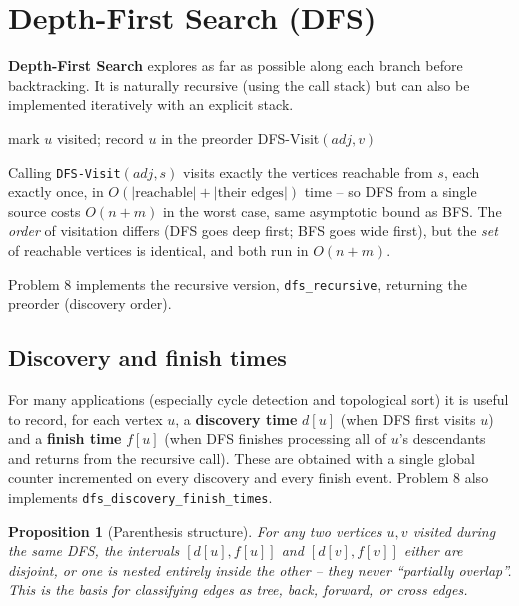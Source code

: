 \documentclass[11pt]{article}
\newtheorem{proposition}[theorem]{Proposition}
\begin{document}
\section{Depth-First Search (DFS)}

\textbf{Depth-First Search} explores as far as possible along each branch before
backtracking. It is naturally recursive (using the call stack) but can also be
implemented iteratively with an explicit stack.

\begin{algorithm}[h]
\caption{DFS-Visit$(adj, u)$ -- recursive}
\begin{algorithmic}[1]
\State mark $u$ visited; record $u$ in the preorder
        \State DFS-Visit$(adj, v)$
    \EndIf
\EndFor
\end{algorithmic}
\end{algorithm}

Calling \texttt{DFS-Visit}$(adj, s)$ visits exactly the vertices reachable from $s$, each
exactly once, in $O(|\text{reachable}| + |\text{their edges}|)$ time -- so DFS from a
single source costs $O(n+m)$ in the worst case, same asymptotic bound as BFS. The
\emph{order} of visitation differs (DFS goes deep first; BFS goes wide first), but the
\emph{set} of reachable vertices is identical, and both run in $O(n+m)$.

Problem 8 implements the recursive version, \texttt{dfs\_recursive}, returning the
preorder (discovery order).

\subsection{Discovery and finish times}

For many applications (especially cycle detection and topological sort) it is useful to
record, for each vertex $u$, a \textbf{discovery time} $d[u]$ (when DFS first visits $u$)
and a \textbf{finish time} $f[u]$ (when DFS finishes processing all of $u$'s descendants
and returns from the recursive call). These are obtained with a single global counter
incremented on every discovery and every finish event. Problem 8 also implements
\texttt{dfs\_discovery\_finish\_times}.

\begin{proposition}[Parenthesis structure]
For any two vertices $u, v$ visited during the same DFS, the intervals $[d[u], f[u]]$ and
$[d[v], f[v]]$ either are disjoint, or one is nested entirely inside the other -- they
never ``partially overlap''. This is the basis for classifying edges as tree, back,
forward, or cross edges.
\end{proposition}
\end{document}
